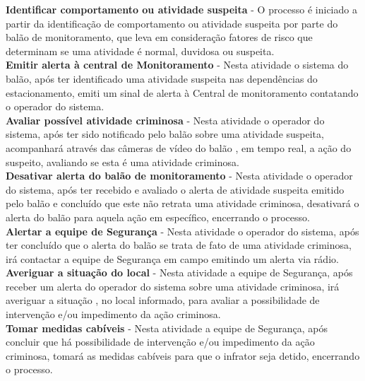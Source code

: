 \textbf{Identificar comportamento ou atividade suspeita} - O processo é iniciado a partir da identificação de comportamento ou atividade suspeita por parte do balão de monitoramento, que leva em consideração fatores de risco que determinam se uma atividade é normal, duvidosa ou suspeita.
\\

\textbf{Emitir alerta à central de Monitoramento} - Nesta atividade o sistema do balão, após ter identificado uma atividade suspeita nas dependências do estacionamento, emiti um sinal de alerta à Central de monitoramento contatando o operador do sistema.
\\

\textbf{Avaliar possível atividade criminosa} - Nesta atividade o operador do sistema, após ter sido notificado pelo balão sobre uma atividade suspeita, acompanhará através das câmeras de vídeo do balão , em tempo real, a ação do suspeito, avaliando se esta é uma atividade criminosa.
\\

\textbf{Desativar alerta do balão de monitoramento} - Nesta atividade o operador do sistema, após ter recebido e avaliado o alerta de atividade suspeita emitido pelo balão e concluído que este não retrata uma atividade criminosa, desativará o alerta do balão para aquela ação em específico, encerrando o processo.
\\

\textbf{Alertar a equipe de Segurança} - Nesta atividade o operador do sistema, após ter concluído que o alerta do balão se trata de fato de uma atividade criminosa, irá contactar a equipe de Segurança em campo emitindo um alerta via rádio.
\\

\textbf{Averiguar a situação do local} - Nesta atividade a equipe de Segurança, após receber um alerta do operador do sistema sobre uma atividade criminosa, irá averiguar a situação , no local informado, para avaliar a possibilidade de intervenção e/ou impedimento da ação criminosa.
\\

\textbf{Tomar medidas cabíveis} - Nesta atividade a equipe de Segurança, após concluir que há possibilidade de intervenção e/ou impedimento da ação criminosa, tomará as medidas cabíveis para que o infrator seja detido, encerrando o processo.
\\

